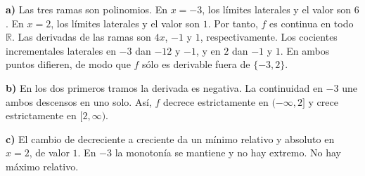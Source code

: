\textbf{a)} Las tres ramas son polinomios. En $x=-3$, los límites laterales y el valor son $6$. En $x=2$, los límites laterales y el valor son $1$. Por tanto, $f$ es continua en todo $\mathbb R$. Las derivadas de las ramas son $4x$, $-1$ y $1$, respectivamente. Los cocientes incrementales laterales en $-3$ dan $-12$ y $-1$, y en $2$ dan $-1$ y $1$. En ambos puntos difieren, de modo que $f$ sólo es derivable fuera de $\{-3,2\}$.

\textbf{b)} En los dos primeros tramos la derivada es negativa. La continuidad en $-3$ une ambos descensos en uno solo. Así, $f$ decrece estrictamente en $(-\infty,2]$ y crece estrictamente en $[2,\infty)$.

\textbf{c)} El cambio de decreciente a creciente da un mínimo relativo y absoluto en $x=2$, de valor $\boxed{1}$. En $-3$ la monotonía se mantiene y no hay extremo. No hay máximo relativo.
